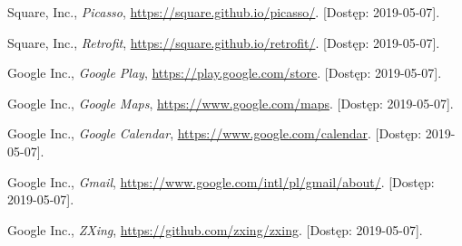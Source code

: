 \documentclass{pracamgr}
\begin{document}
\begin{thebibliography}{99}
 Square, Inc., \textit{Picasso}, \url{https://square.github.io/picasso/}. [Dostęp: 2019-05-07].

 Square, Inc., \textit{Retrofit}, \url{https://square.github.io/retrofit/}. [Dostęp: 2019-05-07].

 Google Inc., \textit{Google Play},	\url{https://play.google.com/store}. [Dostęp: 2019-05-07].

 Google Inc., \textit{Google Maps},	\url{https://www.google.com/maps}. [Dostęp: 2019-05-07].

 Google Inc., \textit{Google Calendar},	\url{https://www.google.com/calendar}. [Dostęp: 2019-05-07].

 Google Inc., \textit{Gmail}, \url{https://www.google.com/intl/pl/gmail/about/}. [Dostęp: 2019-05-07].

 Google Inc., \textit{ZXing}, \url{https://github.com/zxing/zxing}. [Dostęp: 2019-05-07].

\end{thebibliography}
\end{document}
